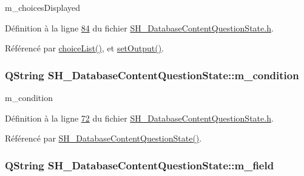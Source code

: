 m\-\_\-choices\-Displayed 



Définition à la ligne \hyperlink{SH__DatabaseContentQuestionState_8h_source_l00084}{84} du fichier \hyperlink{SH__DatabaseContentQuestionState_8h_source}{S\-H\-\_\-\-Database\-Content\-Question\-State.\-h}.



Référencé par \hyperlink{classSH__DatabaseContentQuestionState_a14ca81b7c20c9e20e9d9e327b513f6ec}{choice\-List()}, et \hyperlink{classSH__DatabaseContentQuestionState_aaec6c7f8bc78c6beb7447fc41ffe3875}{set\-Output()}.

\hypertarget{classSH__DatabaseContentQuestionState_aaffd467fccc69b6d46194f04831a1edc}{
\subsubsection[{m\-\_\-condition}]{\setlength{\rightskip}{0pt plus 5cm}Q\-String S\-H\-\_\-\-Database\-Content\-Question\-State\-::m\-\_\-condition\hspace{0.3cm}{\ttfamily [private]}}}\label{classSH__DatabaseContentQuestionState_aaffd467fccc69b6d46194f04831a1edc}


m\-\_\-condition 



Définition à la ligne \hyperlink{SH__DatabaseContentQuestionState_8h_source_l00072}{72} du fichier \hyperlink{SH__DatabaseContentQuestionState_8h_source}{S\-H\-\_\-\-Database\-Content\-Question\-State.\-h}.



Référencé par \hyperlink{classSH__DatabaseContentQuestionState_ab26490ea519262a8f9ca72c000bf7313}{S\-H\-\_\-\-Database\-Content\-Question\-State()}.

\hypertarget{classSH__DatabaseContentQuestionState_a32b3f4f2cadbc4837add2556c1a926d4}{
\subsubsection[{m\-\_\-field}]{\setlength{\rightskip}{0pt plus 5cm}Q\-String S\-H\-\_\-\-Database\-Content\-Question\-State\-::m\-\_\-field\hspace{0.3cm}{\ttfamily [private]}}}\label{classSH__DatabaseContentQuestionState_a32b3f4f2cadbc4837add2556c1a926d4}


